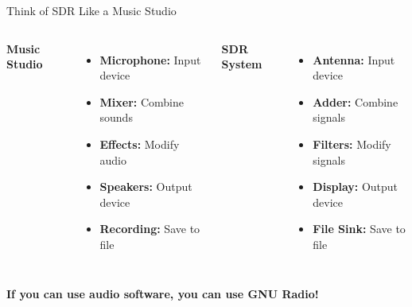 \documentclass[aspectratio=169,11pt]{beamer}
\begin{document}
\begin{frame}{Think of SDR Like a Music Studio}
\begin{columns}
\textbf{\Large Music Studio}
\begin{itemize}
    \item \textbf{Microphone:} Input device
    \item \textbf{Mixer:} Combine sounds
    \item \textbf{Effects:} Modify audio
    \item \textbf{Speakers:} Output device
    \item \textbf{Recording:} Save to file
\end{itemize}

\textbf{\Large SDR System}
\begin{itemize}
    \item \textbf{Antenna:} Input device
    \item \textbf{Adder:} Combine signals
    \item \textbf{Filters:} Modify signals
    \item \textbf{Display:} Output device
    \item \textbf{File Sink:} Save to file
\end{itemize}
\end{columns}
\vspace{1em}
\begin{center}\colorbox{yellow!20}{\parbox{0.9\textwidth}{
\centering
\large\textbf{If you can use audio software, you can use GNU Radio!}
}}\end{center}
\end{frame}
\end{document}
